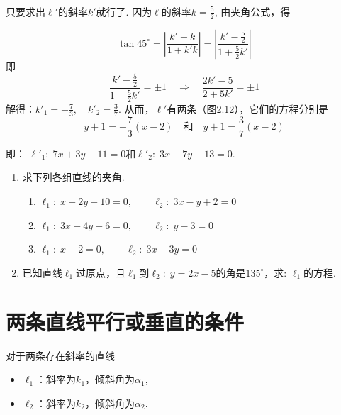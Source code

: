\begin{solution}
    只要求出$\ell'$的斜率$k'$就行了. 因为$\ell$的斜率$k=\frac{5}{2}$, 由夹角公式，得
\begin{minipage}{.55\textwidth}
\[\tan45^{\circ}=\left|\frac{k'-k}{1+k'k}\right|=\left|\frac{k'-\frac{5}{2}}{1+\frac{5}{2}k'}\right|\]
即
\[\frac{k'-\frac{5}{2}}{1+\frac{5}{2}k'}=\pm 1 \quad  \Rightarrow \quad \frac{2k'-5}{2+5k'}=\pm 1\]
解得：$k'_1=-\frac{7}{3},\quad k'_2=\frac{3}{7}$. 从而，$\ell'$有两条（图2.12），它们的方程分别是
\[y+1=-\frac{7}{3}(x-2)\quad \text{和}\quad y+1=\frac{3}{7}(x-2)\]
\end{minipage}
\hfill
\begin{minipage}{.4\textwidth}
\centering
{}
\end{minipage}
即：
$\ell'_1:\; 7x+3y-11=0$和$\ell'_2:\; 3x-7y-13=0$.
\end{solution}

\begin{ex}
\begin{enumerate}
    \item 求下列各组直线的夹角.
\begin{enumerate}[(1)]
    \item $\ell_1:\; x-2y-10=0,\qquad   \ell_2:\; 3x-y+2=0$
    \item $\ell_1:\; 3x+4y+6=0,\qquad   \ell_2:\; y-3=0$
    \item $\ell_1:\; x+2=0,\qquad     \ell_2:\; 3x-3y=0$
\end{enumerate}
    \item 已知直线$\ell_1$过原点，且$\ell_1$到$\ell_2:\; y=2x-5$的角是$135^{\circ}$，求: $\ell_1$的方程.
\end{enumerate}
\end{ex}


\section{两条直线平行或垂直的条件}
对于两条存在斜率的直线
\begin{itemize}
    \item $\ell_1$：斜率为$k_1$，倾斜角为$\alpha_1$,
    \item $\ell_2$：斜率为$k_2$，倾斜角为$\alpha_2$.
\end{itemize}

